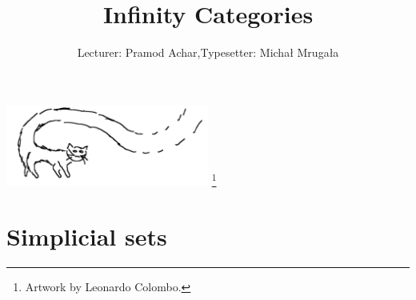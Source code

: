 

\def\CC{\mathcal C}
\def\CS{\mathcal S}
\def\CT{\mathcal T}
\def\Sing{\operatorname{Sing}}
\def\map{\operatorname{map}}
\def\Mor{\operatorname{Mor}}
\def\1b{\mathbb{1}}
\def\R{\bb{R}}
\def\Ch{\cat{Ch}}
\def\Cone{\operatorname{Cone}}
\def\S{\mathbb{S}}
\def\smap{\operatorname{smap}}

\title{Infinity Categories}
\author{Lecturer: Pramod Achar,\quad Typesetter: Micha{\l} Mruga{\l}a}



\begin{center}
	\includegraphics[width=0.5\textwidth]{TheInfinityCat.png}
	\footnote{Artwork by Leonardo Colombo.}
\end{center}
\maketitle

\section{Simplicial sets}

